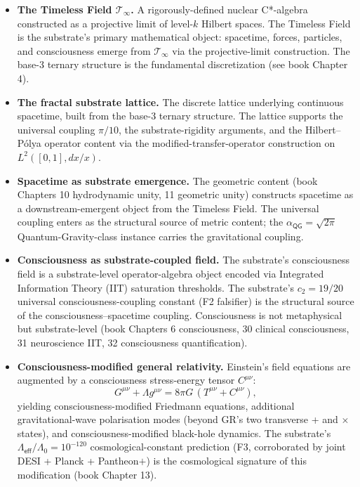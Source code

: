 \documentclass[11pt,a4paper]{amsart}
\theoremstyle{plain}
\theoremstyle{definition}
\begin{document}
\begin{itemize}[itemsep=4pt,leftmargin=2em]
\item \textbf{The Timeless Field $\mathcal{T}_\infty$.} A rigorously-defined nuclear C*-algebra constructed as a projective limit of level-$k$ Hilbert spaces. The Timeless Field is the substrate's primary mathematical object: spacetime, forces, particles, and consciousness emerge from $\mathcal{T}_\infty$ via the projective-limit construction. The base-3 ternary structure is the fundamental discretization (see book Chapter 4).
\item \textbf{The fractal substrate lattice.} The discrete lattice underlying continuous spacetime, built from the base-3 ternary structure. The lattice supports the universal coupling $\pi/10$, the substrate-rigidity arguments, and the Hilbert--P\'olya operator content via the modified-transfer-operator construction on $L^2([0,1], dx/x)$.
\item \textbf{Spacetime as substrate emergence.} The geometric content (book Chapters 10 hydrodynamic unity, 11 geometric unity) constructs spacetime as a downstream-emergent object from the Timeless Field. The universal coupling enters as the structural source of metric content; the $\alpha_{\textsf{QG}} = \sqrt{2\pi}$ Quantum-Gravity-class instance carries the gravitational coupling.
\item \textbf{Consciousness as substrate-coupled field.} The substrate's consciousness field is a substrate-level operator-algebra object encoded via Integrated Information Theory (IIT) saturation thresholds. The substrate's $c_2 = 19/20$ universal consciousness-coupling constant (F2 falsifier) is the structural source of the consciousness--spacetime coupling. Consciousness is not metaphysical but substrate-level (book Chapters 6 consciousness, 30 clinical consciousness, 31 neuroscience IIT, 32 consciousness quantification).
\item \textbf{Consciousness-modified general relativity.} Einstein's field equations are augmented by a consciousness stress-energy tensor $C^{\mu\nu}$:
\[
G^{\mu\nu} + \Lambda g^{\mu\nu} = 8\pi G\,(T^{\mu\nu} + C^{\mu\nu}),
\]
yielding consciousness-modified Friedmann equations, additional gravitational-wave polarisation modes (beyond GR's two transverse + and $\times$ states), and consciousness-modified black-hole dynamics. The substrate's $\Lambda_{\textsf{eff}}/\Lambda_0 = 10^{-120}$ cosmological-constant prediction (F3, corroborated by joint DESI + Planck + Pantheon$+$) is the cosmological signature of this modification (book Chapter 13).

\end{itemize}
\end{document}

